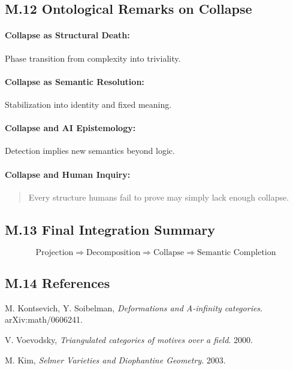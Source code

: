 \documentclass[11pt]{article}
\begin{document}
\begin{axiom}
\begin{axiom}
{{\subsection*{M.12 Ontological Remarks on Collapse}

\paragraph{Collapse as Structural Death:}  
Phase transition from complexity into triviality.

\paragraph{Collapse as Semantic Resolution:}  
Stabilization into identity and fixed meaning.

\paragraph{Collapse and AI Epistemology:}  
Detection implies new semantics beyond logic.

\paragraph{Collapse and Human Inquiry:}  
\begin{quote}
Every structure humans fail to prove may simply lack enough collapse.
\end{quote}

\subsection*{M.13 Final Integration Summary}

\[
\text{Projection} \Rightarrow \text{Decomposition} \Rightarrow \text{Collapse} \Rightarrow \text{Semantic Completion}
\]

\subsection*{M.14 References}

\begin{thebibliography}{9}
M. Kontsevich, Y. Soibelman,  
\textit{Deformations and A-infinity categories}. arXiv:math/0606241.

V. Voevodsky,  
\textit{Triangulated categories of motives over a field}. 2000.

M. Kim,  
\textit{Selmer Varieties and Diophantine Geometry}. 2003.


\end{thebibliography}}}
\end{axiom}
\end{axiom}
\end{document}
